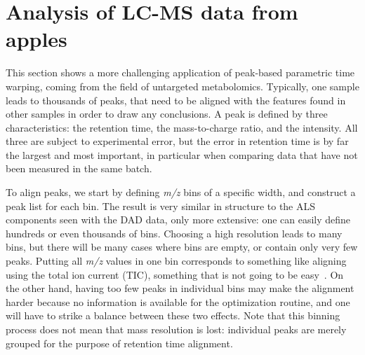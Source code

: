 \documentclass[a4paper,11pt]{article}
\begin{document}
\section{Analysis of LC-MS data from apples}
This section shows a more challenging application of peak-based
parametric time warping, coming from the field of untargeted
metabolomics. Typically, one sample leads to thousands of peaks, that
need to be aligned with the features found in other samples in order
to draw any conclusions. A peak is defined by three characteristics:
the retention time, the mass-to-charge ratio, and the intensity. All
three are subject to experimental error, but the error in retention
time is by far the largest and most important, in particular when
comparing data that have not been measured in the same batch.

To align peaks, we start by defining \emph{m/z} bins of a specific
width, and construct a peak list for each bin. The result is very
similar in structure to the ALS components seen with the DAD data,
only more extensive: one can easily define hundreds or even thousands
of bins. Choosing a high resolution leads to many bins, but there
will be many cases where bins are empty, or contain only very few
peaks. Putting all \emph{m/z} values in one bin corresponds to
something like aligning using the total ion current (TIC), something
that is not going to be easy~\citep{Bloemberg2010}. On the other hand,
having too few peaks in individual bins may make the alignment 
harder because no information is available for the optimization
routine, and one will have to strike a balance between these two effects.
Note that this binning process does not mean that mass resolution is lost:
individual peaks are merely grouped for the purpose of retention time
alignment.
\end{document}
